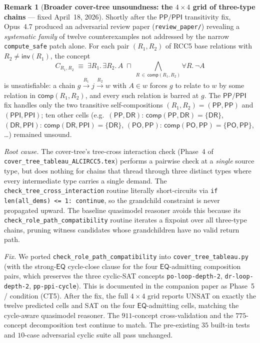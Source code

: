 \documentclass[
]{ceurart}
\theoremstyle{definition}
\newtheorem{remark}[theorem]{Remark}
\newcommand{\DR}{\ensuremath{\mathsf{DR}}}
\newcommand{\PO}{\ensuremath{\mathsf{PO}}}
\newcommand{\EQ}{\ensuremath{\mathsf{EQ}}}
\newcommand{\PP}{\ensuremath{\mathsf{PP}}}
\newcommand{\PPI}{\ensuremath{\mathsf{PPI}}}
\newcommand{\inv}{\ensuremath{\mathsf{inv}}}
\newcommand{\comp}{\ensuremath{\mathsf{comp}}}
\begin{document}
\begin{remark}[\textbf{Broader cover-tree unsoundness: the $4\times 4$ grid of three-type chains} --- fixed April~18, 2026]
\label{rem:ct-rolepath-bug}
Shortly after the $\PP/\PPI$ transitivity fix, Opus~4.7 produced
an adversarial review paper (\texttt{review\_paper/}) revealing a
\emph{systematic family} of twelve counterexamples not addressed by
the narrow \texttt{compute\_safe} patch alone. For each pair
$(R_1, R_2)$ of RCC5 base relations with $R_2 \ne \inv(R_1)$, the
concept
\[
  C_{R_1, R_2} \;\equiv\;
  \exists R_1.\,\exists R_2.\,A \;\sqcap\;
  \bigwedge_{R \,\in\, \comp(R_1, R_2)} \forall R.\,\neg A
\]
is unsatisfiable: a chain $g \xrightarrow{R_1} j \xrightarrow{R_2}
w$ with $A \in w$ forces $g$ to relate to $w$ by some relation in
$\comp(R_1, R_2)$, and every such relation is barred at $g$. The
$\PP/\PPI$ fix handles only the two transitive self-compositions
$(R_1, R_2) = (\PP, \PP)$ and $(\PPI, \PPI)$; ten other cells
(e.g.\ $(\PP, \DR)$: $\comp(\PP, \DR) = \{\DR\}$, $(\DR, \PPI)$:
$\comp(\DR, \PPI) = \{\DR\}$, $(\PO, \PP)$: $\comp(\PO, \PP) =
\{\PO, \PP\}$, \ldots) remained unsound.

\emph{Root cause.} The cover-tree's tree-cross interaction check
(Phase~4 of \texttt{cover\_tree\_tableau\_ALCIRCC5.tex}) performs a
pairwise check at a \emph{single} source type, but does nothing
for chains that thread through three distinct types where every
intermediate type carries a single demand. The
\texttt{check\_tree\_cross\_interaction} routine literally
short-circuits via
\texttt{if len(all\_dems) <= 1: continue}, so the grandchild
constraint is never propagated upward. The baseline quasimodel
reasoner avoids this because its \texttt{check\_role\_path\_compatibility}
routine iterates a fixpoint over all three-type chains, pruning
witness candidates whose grandchildren have no valid return path.

\emph{Fix.} We ported \texttt{check\_role\_path\_compatibility}
into \texttt{cover\_tree\_tableau.py} (with the strong-$\EQ$
cycle-close clause for the four $\EQ$-admitting composition pairs,
which preserves the three cyclic-SAT concepts
\texttt{po-loop-depth-2}, \texttt{dr-loop-depth-2},
\texttt{pp-ppi-cycle}). This is documented in the companion paper
as Phase~5 / condition (CT5). After the fix, the full
$4\times 4$ grid reports UNSAT on exactly the twelve predicted
cells and SAT on the four $\EQ$-admitting cells, matching the
cycle-aware quasimodel reasoner. The $911$-concept
cross-validation and the $775$-concept decomposition test
continue to match. The pre-existing $35$ built-in tests and
$10$-case adversarial cyclic suite all pass unchanged.


\end{remark}
\end{document}
